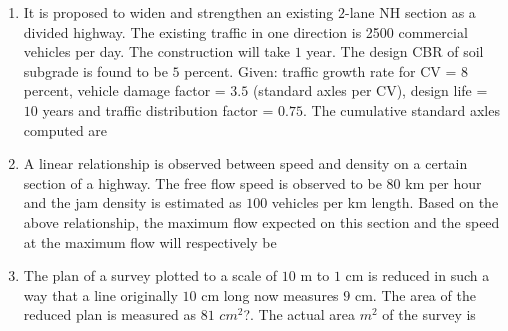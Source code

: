 \documentclass[journal]{IEEEtran}
\begin{document}
\begin{enumerate}
\item It is proposed to widen and strengthen an existing $2$-lane NH section as a divided highway. The existing traffic in one direction is 2500 commercial vehicles  per day. The construction will take $1$ year. The design CBR of soil subgrade is found to be $5$ percent. Given: traffic growth rate for CV = $8$ percent, vehicle damage factor = $3.5$ (standard axles per CV), design life = $10$ years and traffic distribution factor = $0.75$. The cumulative standard axles  computed are \hfill {}
\begin{enumerate}
\end{enumerate}

\item A linear relationship is observed between speed and density on a certain section of a highway. The free flow speed is observed to be $80$ km per hour and the jam density is estimated as $100$ vehicles per km length. Based on the above relationship, the maximum flow expected on this section and the speed at the maximum flow will respectively be \hfill {}
\begin{enumerate}
\end{enumerate}

\item The plan of a survey plotted to a scale of $10$ m to $1$ cm is reduced in such a way that a line originally $10$ cm long now measures $9$ cm. The area of the reduced plan is measured as $81$ $cm^{2}$?. The actual area $m^{2}$ of the survey is \hfill {}
\begin{enumerate}
\end{enumerate}


\end{enumerate}
\end{document}
